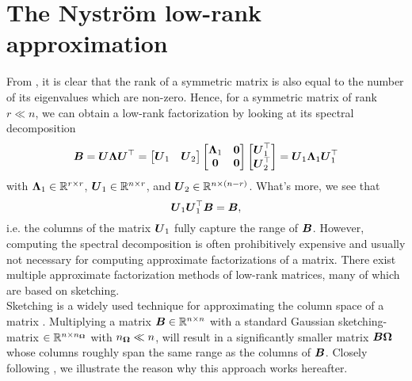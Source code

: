 
\section{The Nystr\"om low-rank approximation}
\label{sec:3-nystrom-nystrom}

From , it is clear that the rank of a symmetric
matrix is also equal to the number of its eigenvalues which are non-zero.
Hence, for a symmetric matrix of rank $r \ll n$, we can obtain a low-rank factorization
by looking at its spectral decomposition
\begin{equation}
    \boldsymbol{B} 
        = \boldsymbol{U} \boldsymbol{\Lambda} \boldsymbol{U}^{\top} 
        = \begin{bmatrix} \boldsymbol{U}_1 & \boldsymbol{U}_2 \end{bmatrix} 
          \begin{bmatrix} \boldsymbol{\Lambda}_1 & \boldsymbol{0} \\ \boldsymbol{0} & \boldsymbol{0} \end{bmatrix} 
          \begin{bmatrix} \boldsymbol{U}_1^{\top} \\ \boldsymbol{U}_2^{\top} \end{bmatrix}
        = \boldsymbol{U}_1 \boldsymbol{\Lambda}_1 \boldsymbol{U}_1^{\top}
    \label{equ:3-nystrom-eigenvalue-decoposition}
\end{equation}
with $\boldsymbol{\Lambda}_1 \in \mathbb{R}^{r \times r}$, $\boldsymbol{U}_1 \in \mathbb{R}^{n \times r}$,
and $\boldsymbol{U}_2 \in \mathbb{R}^{n \times (n - r)}$. What's more, we see that
\begin{equation}
    \boldsymbol{U}_1 \boldsymbol{U}_1^{\top} \boldsymbol{B} = \boldsymbol{B},
    \label{equ:3-nystrom-range-captured}
\end{equation}
i.e. the columns of the matrix $\boldsymbol{U}_1$ fully capture the range of $\boldsymbol{B}$.
However, computing the spectral
decomposition is often prohibitively expensive and usually not necessary for
computing approximate factorizations of a matrix. There exist multiple approximate
factorization methods of low-rank matrices, many of which are based on sketching.\\

Sketching is a widely used technique for approximating the column space of a matrix
\cite{halko2011finding,woodruff2014sketching,lin2017randomized,tropp2017sketching,tropp2023randomized}.
Multiplying a matrix $\boldsymbol{B} \in \mathbb{R}^{n \times n}$ with a standard Gaussian
\gls{sketching-matrix} $\in \mathbb{R}^{n \times n_{\boldsymbol{\Omega}}}$ with $n_{\boldsymbol{\Omega}} \ll n$, will
result in a significantly smaller matrix $\boldsymbol{B}\boldsymbol{\Omega}$ whose
columns roughly span the same range as the columns of $\boldsymbol{B}$.
Closely following \cite[section~2.1]{tropp2023randomized}, we illustrate the
reason why this approach works hereafter.\\

